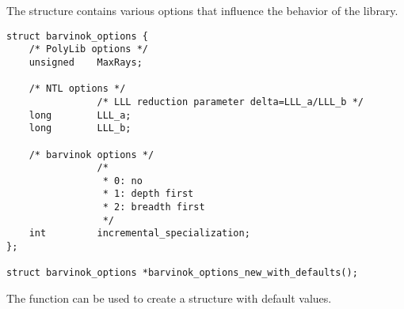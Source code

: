 The  structure contains various
options that influence the behavior of the library.

\begin{verbatim}
struct barvinok_options {
    /* PolyLib options */
    unsigned    MaxRays;

    /* NTL options */
                /* LLL reduction parameter delta=LLL_a/LLL_b */
    long        LLL_a;
    long        LLL_b;

    /* barvinok options */
                /*
                 * 0: no
                 * 1: depth first
                 * 2: breadth first
                 */
    int         incremental_specialization;
};

struct barvinok_options *barvinok_options_new_with_defaults();
\end{verbatim}

The function 
can be used to create a  structure
with default values.

